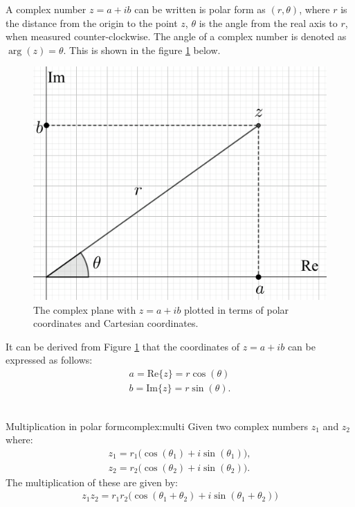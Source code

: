\noindent A complex number $z=a+ib$ can be written is polar form as $(r,\theta)$, where $r$ is the distance from the origin to the point $z$, $\theta$ is the angle from the real axis to $r$, when measured counter-clockwise. The angle of a complex number is denoted as $\arg(z)=\theta$. This is shown in the figure \ref{fig:complex_plane_polar} below.
\begin{figure}[H] 
\centering
\includegraphics[scale=0.15]{fig/img/complex_plan_polar}
\caption{The complex plane with $z=a+ib$ plotted in terms of polar coordinates and Cartesian coordinates.}
\label{fig:complex_plane_polar}
\end{figure}
\noindent
It can be derived from Figure \ref{fig:complex_plane_polar} that the coordinates of $z=a+ib$ can be expressed as follows:
\begin{align}
a=\text{Re}\{z\}=r\cos(\theta)
\\
b=\text{Im}\{z\}=r\sin(\theta).
\end{align}
\\

\begin{theorem}{Multiplication in polar form}{complex:multi}
Given two complex numbers $z_1$ and $z_2$ where:
\begin{align*}
z_1=r_1\big( \cos(\theta_1)+i\sin(\theta_1) \big), 
\\
z_2=r_2\big( \cos(\theta_2)+i\sin(\theta_2) \big).
\end{align*}
The multiplication of these are given by:
\begin{align}
z_1 z_2=r_1r_2\big( \cos(\theta_1+\theta_2)+ i \sin(\theta_1+\theta_2)\big) \label{pol:trig}
\end{align}
\end{theorem}


